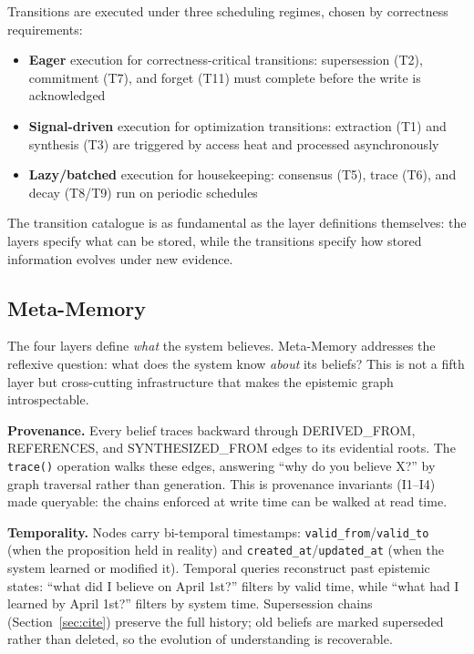 \documentclass[11pt,letterpaper]{article}
\begin{document}
Transitions are executed under three scheduling regimes, chosen by correctness requirements:
\begin{itemize}[noitemsep]
    \item \textbf{Eager} execution for correctness-critical transitions: supersession (T2), commitment (T7), and forget (T11) must complete before the write is acknowledged
    \item \textbf{Signal-driven} execution for optimization transitions: extraction (T1) and synthesis (T3) are triggered by access heat and processed asynchronously
    \item \textbf{Lazy/batched} execution for housekeeping: consensus (T5), trace (T6), and decay (T8/T9) run on periodic schedules
\end{itemize}

The transition catalogue is as fundamental as the layer definitions themselves: the layers specify what can be stored, while the transitions specify how stored information evolves under new evidence.

\subsection{Meta-Memory}

The four layers define \textit{what} the system believes. Meta-Memory addresses the reflexive question: what does the system know \textit{about} its beliefs? This is not a fifth layer but cross-cutting infrastructure that makes the epistemic graph introspectable.

\textbf{Provenance.} Every belief traces backward through DERIVED\_FROM, REFERENCES, and SYNTHESIZED\_FROM edges to its evidential roots. The \texttt{trace()} operation walks these edges, answering ``why do you believe X?'' by graph traversal rather than generation. This is provenance invariants (I1--I4) made queryable: the chains enforced at write time can be walked at read time.

\textbf{Temporality.} Nodes carry bi-temporal timestamps: \texttt{valid\_from}/\texttt{valid\_to} (when the proposition held in reality) and \texttt{created\_at}/\texttt{updated\_at} (when the system learned or modified it). Temporal queries reconstruct past epistemic states: ``what did I believe on April 1st?'' filters by valid time, while ``what had I learned by April 1st?'' filters by system time. Supersession chains (Section~\ref{sec:cite}) preserve the full history; old beliefs are marked superseded rather than deleted, so the evolution of understanding is recoverable.
\end{document}
